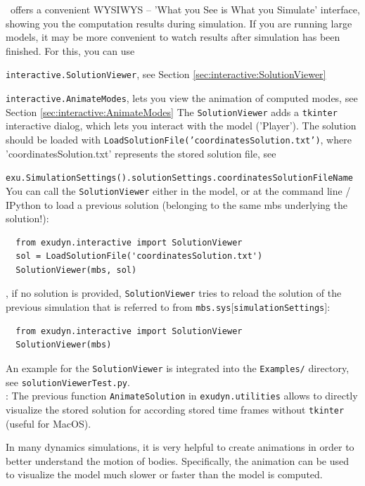 \label{secSolutionViewer}
\codeName\ offers a convenient WYSIWYS -- 'What you See is What you Simulate' interface, showing you the computation results during simulation.
If you are running large models, it may be more convenient to watch results after simulation has been finished.
For this, you can use
\bi
  \item \texttt{interactive.SolutionViewer}, see Section \ref{sec:interactive:SolutionViewer}
  \item \texttt{interactive.AnimateModes}, lets you view the animation of computed modes, see Section \ref{sec:interactive:AnimateModes}
\ei
The \texttt{SolutionViewer} adds a \texttt{tkinter} interactive dialog, which lets you interact with the model ('Player').
The solution should be loaded with
\texttt{LoadSolutionFile('coordinatesSolution.txt')}, where 'coordinatesSolution.txt' represents the stored solution file, 
see 
\bi
  \item \texttt{exu.SimulationSettings().solutionSettings.coordinatesSolutionFileName}
\ei
You can call the \texttt{SolutionViewer} either in the model, or at the command line / IPython to load a previous solution (belonging to the same mbs underlying the solution!):
\pythonstyle\begin{lstlisting}
  from exudyn.interactive import SolutionViewer
  sol = LoadSolutionFile('coordinatesSolution.txt')
  SolutionViewer(mbs, sol)
\end{lstlisting}
%
, if no solution is provided, \texttt{SolutionViewer} tries to reload the solution of the previous simulation that is referred to from \texttt{mbs.sys$[$simulationSettings$]$}:
\pythonstyle\begin{lstlisting}
  from exudyn.interactive import SolutionViewer
  SolutionViewer(mbs)
\end{lstlisting}
An example for the \texttt{SolutionViewer} is integrated into the \texttt{Examples/} directory, see \texttt{solutionViewerTest.py}. \\
: The previous function \texttt{AnimateSolution} in \texttt{exudyn.utilities} allows to directly visualize the stored solution for according stored time frames without \texttt{tkinter} (useful for MacOS).

\label{secGeneratingAnimations}
%
In many dynamics simulations, it is very helpful to create animations in order to better understand the motion of bodies. Specifically, the animation can be used to visualize the model much slower or faster than the model is computed.

